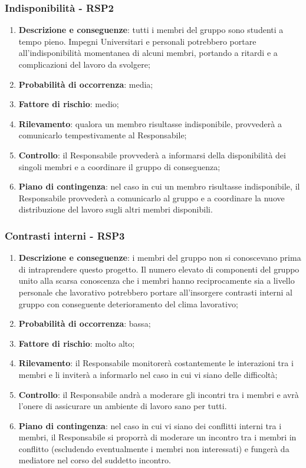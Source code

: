 	\subsubsection{Indisponibilità - RSP2}
	\begin{enumerate}
		\item \textbf{Descrizione e conseguenze}: tutti i membri del gruppo sono studenti a tempo pieno. Impegni Universitari e personali potrebbero portare all'indisponibilità momentanea di alcuni membri, portando a ritardi e a complicazioni del lavoro da svolgere; 
		\item \textbf{Probabilità di occorrenza}: media;
		\item \textbf{Fattore di rischio}: medio;
		\item \textbf{Rilevamento}: qualora un membro risultasse indisponibile, provvederà a comunicarlo tempestivamente al Responsabile;
		\item \textbf{Controllo}: il Responsabile provvederà a informarsi della disponibilità dei singoli membri e a coordinare il gruppo di conseguenza;
		\item \textbf{Piano di contingenza}: nel caso in cui un membro risultasse indisponibile, il Responsabile provvederà a comunicarlo al gruppo e a coordinare la nuove distribuzione del lavoro sugli altri membri disponibili.
	\end{enumerate}
	
	\subsubsection{Contrasti interni - RSP3}
	\begin{enumerate}
		\item \textbf{Descrizione e conseguenze}: i membri del gruppo non si conoscevano prima di intraprendere questo progetto. Il numero elevato di componenti del gruppo unito alla scarsa conoscenza che i membri hanno reciprocamente sia a livello personale che lavorativo potrebbero portare all'insorgere contrasti interni al gruppo con conseguente deterioramento del clima lavorativo;
		\item \textbf{Probabilità di occorrenza}: bassa;
		\item \textbf{Fattore di rischio}: molto alto;
		\item \textbf{Rilevamento}: il Responsabile monitorerà costantemente le interazioni tra i membri e li inviterà a informarlo nel caso in cui vi siano delle difficoltà;
		\item \textbf{Controllo}: il Responsabile andrà a moderare gli incontri tra i membri e avrà l'onere di assicurare un ambiente di lavoro sano per tutti. 
		\item \textbf{Piano di contingenza}: nel caso in cui vi siano dei conflitti interni tra i membri, il Responsabile si proporrà di moderare un incontro tra i membri in conflitto (escludendo eventualmente i membri non interessati) e fungerà da mediatore nel corso del suddetto incontro.
	\end{enumerate}
	
